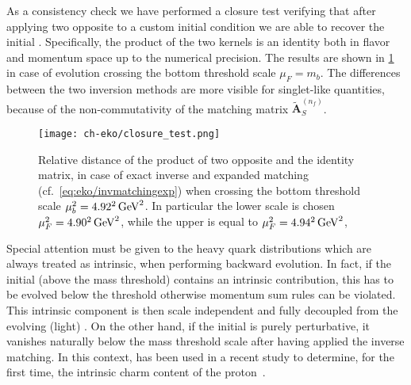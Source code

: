 As a consistency check we have performed a closure test verifying that after
applying two opposite \ekos{} to a custom initial condition
we are able to recover the initial \pdf{}. Specifically, the product of the
two kernels is an identity both in flavor and momentum space up to
the numerical precision. The results are shown in \cref{fig:eko/closure_test} in case of \nnlo{} evolution
crossing the bottom threshold scale $\mu_{F}=m_{b}$. The differences between
the two inversion methods are more visible for singlet-like quantities,
because of the non-commutativity of the matching matrix $\tilde{\mathbf{A}}_{S}^{(n_f)}$.  

\begin{figure}
    \begin{center}
    \texttt{[image: ch-eko/closure\_test.png]}
    \end{center}
    \caption{Relative distance of the product of two opposite \nnlo{} \ekos{}
        and the identity matrix, in case of exact inverse and expanded
        matching (cf.\ \cref{eq:eko/invmatchingexp}) when crossing the bottom
        threshold scale $\mu_{b}^2=\SI[parse-numbers=false]{4.92^2}{\GeV^2}$. In particular the lower scale is chosen $\muF^2=\SI[parse-numbers=false]{4.90^2}{\GeV^2}$, 
        while the upper is equal to $\muF^2=\SI[parse-numbers=false]{4.94^2}{\GeV^2}$, 
        \label{fig:eko/closure_test}
    }
\end{figure}

Special attention must be given to the heavy quark distributions which are
always treated as intrinsic, when performing backward evolution.
In fact, if the initial \pdf{} (above the mass threshold) contains an intrinsic contribution, this has to be evolved
below the threshold otherwise momentum sum rules can be violated.
This intrinsic component is then scale independent and fully decoupled
from the evolving (light) \pdfs.
On the other hand, if the initial \pdf{} is purely perturbative, it vanishes
naturally below the mass threshold scale after having applied the
inverse matching.
In this context, \eko{} has been used in a recent study to determine, for the first time,
the intrinsic charm content of the proton~\cite{Ball:2022qks}.
